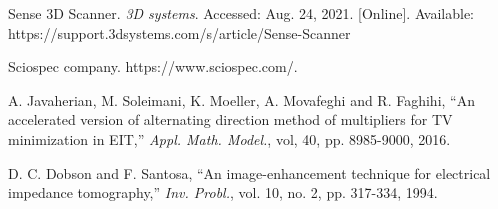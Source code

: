 \documentclass[lettersize,journal]{IEEEtran}
\begin{document}
\begin{thebibliography}{00}
 Sense 3D Scanner. \emph{3D systems}. Accessed: Aug. 24, 2021. [Online]. Available: https://support.3dsystems.com/s/article/Sense-Scanner

 Sciospec company. https://www.sciospec.com/.


 A. Javaherian, M. Soleimani, K. Moeller, A. Movafeghi and R. Faghihi, ``An accelerated version of alternating direction method of multipliers for TV minimization in EIT,'' \emph{Appl. Math. Model.}, vol, 40,  pp. 8985-9000, 2016.

 D. C. Dobson and F. Santosa, ``An image-enhancement technique for electrical impedance tomography,'' \emph{Inv. Probl.}, vol. 10, no. 2, pp. 317-334, 1994.

\end{thebibliography}
\end{document}
